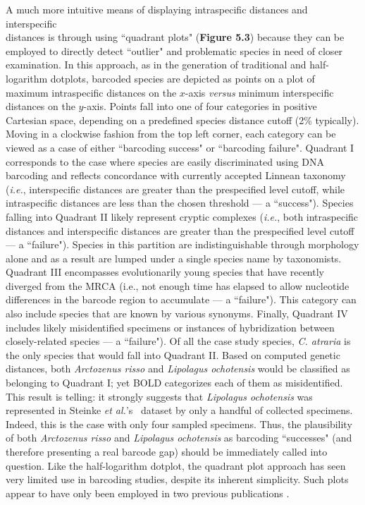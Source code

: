 A much more intuitive means of displaying intraspecific distances and interspecific \\ distances is through using ``quadrant plots" (\textbf{Figure 5.3}) because they can be employed to directly detect ``outlier" and problematic species in need of closer examination. In this approach, as in the generation of traditional and half-logarithm dotplots, barcoded species are depicted as points on a plot of maximum intraspecific distances on the $x$-axis \textit{versus} minimum interspecific distances on the $y$-axis. Points fall into one of four categories in positive Cartesian space, depending on a predefined species distance cutoff (2\% typically). Moving in a clockwise fashion from the top left corner, each category can be viewed as a case of either ``barcoding success" or ``barcoding failure". Quadrant I corresponds to the case where species are easily discriminated using DNA barcoding and reflects concordance with currently accepted Linnean taxonomy (\textit{i.e.}, interspecific distances are greater than the prespecified level cutoff, while intraspecific distances are less than the chosen threshold --- a ``success"). Species falling into Quadrant II likely represent cryptic complexes (\textit{i.e.}, both intraspecific distances and interspecific distances are greater than the prespecified level cutoff --- a ``failure"). Species in this partition are indistinguishable through morphology alone and as a result are lumped under a single species name by taxonomists. Quadrant III encompasses evolutionarily young species that have recently diverged from the MRCA (i.e., not enough time has elapsed to allow nucleotide differences in the barcode region to accumulate --- a ``failure"). This category can also include species that are known by various synonyms. Finally, Quadrant IV includes likely misidentified specimens or instances of hybridization between closely-related species --- a ``failure"). Of all the case study species, \textit{C. atraria} is the only species that would fall into Quadrant II. Based on computed genetic distances, both \textit{Arctozenus risso} and \textit{Lipolagus ochotensis} would be classified as belonging to Quadrant I; yet BOLD categorizes each of them as misidentified. This result is telling: it strongly suggests that \textit{Lipolagus ochotensis} was represented in Steinke \textit{et al.}'s~\cite{steinke2009dna} dataset by only a handful of collected specimens. Indeed, this is the case with only four sampled specimens. Thus, the plausibility of both \textit{Arctozenus risso} and \textit{Lipolagus ochotensis} as barcoding ``successes" (and therefore presenting a real barcode gap) should be immediately called into question. Like the half-logarithm dotplot, the quadrant plot approach has seen very limited use in barcoding studies, despite its inherent simplicity. Such plots appear to have only been employed in two previous publications \cite{hebert2004identification, hubert2015dna}. 

